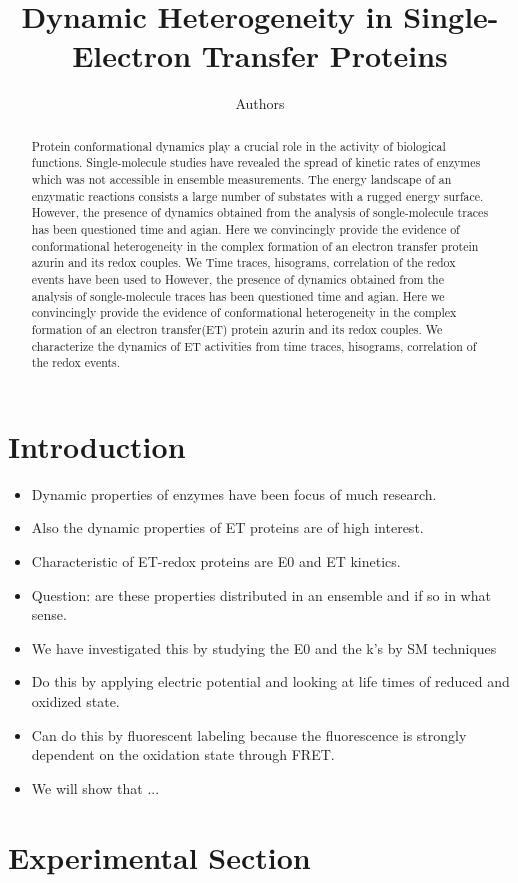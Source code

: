 \documentclass[journal=jacsat,manuscript=article]{achemso}
\author{Authors}
\affiliation{Huygens-Kamerlingh Onnes Laboratory, Leiden University, RA, Leiden, The Netherlands}
\title[]
{Dynamic Heterogeneity in Single-Electron Transfer Proteins}
\begin{document}
\begin{abstract}
	Protein conformational dynamics play a crucial role in the activity of biological functions. Single-molecule studies have revealed the spread of kinetic rates of enzymes which was not accessible in ensemble measurements.
	The energy landscape of an enzymatic reactions consists a large number of substates with a rugged energy surface.
	However, the presence of dynamics obtained from the analysis of songle-molecule traces has been questioned time and agian. Here we convincingly provide the evidence of conformational heterogeneity in the complex formation of an electron transfer protein azurin and its redox couples. We Time traces, hisograms, correlation of the redox events have been used to 
	However, the presence of dynamics obtained from the analysis of songle-molecule traces has been questioned time and agian. Here we convincingly provide the evidence of conformational heterogeneity in the complex formation of an electron transfer(ET) protein azurin and its redox couples. We characterize the dynamics of ET activities from time traces, hisograms, correlation of the redox events. 
\end{abstract}
\section{Introduction}
\begin{itemize}
	\item Dynamic properties of enzymes have been focus of much research.
	\item Also the dynamic properties of ET proteins are of high interest.
	\item Characteristic of ET-redox proteins are E0 and ET kinetics.
	\item Question: are these properties distributed in an ensemble and if so in what sense.
	\item We have investigated this by studying the E0 and the k's by SM techniques
	\item Do this by applying electric potential and looking at life times of reduced and oxidized state.
	\item Can do this by fluorescent labeling because the fluorescence is strongly dependent on the oxidation state through FRET.
	\item We will show that $...$
\end{itemize}
\section{Experimental Section}
\end{document}

